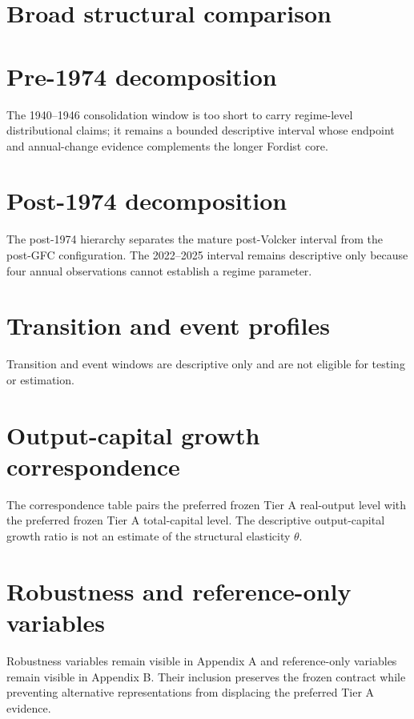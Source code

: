 \documentclass[11pt]{article}
\begin{document}
\section{Broad structural comparison}

\section{Pre-1974 decomposition}
The 1940--1946 consolidation window is too short to carry regime-level distributional claims; it remains a bounded descriptive interval whose endpoint and annual-change evidence complements the longer Fordist core.

\section{Post-1974 decomposition}
The post-1974 hierarchy separates the mature post-Volcker interval from the post-GFC configuration. The 2022--2025 interval remains descriptive only because four annual observations cannot establish a regime parameter.

\section{Transition and event profiles}
Transition and event windows are descriptive only and are not eligible for testing or estimation.

\section{Output-capital growth correspondence}
The correspondence table pairs the preferred frozen Tier A real-output level with the preferred frozen Tier A total-capital level. The descriptive output-capital growth ratio is not an estimate of the structural elasticity $\theta$.

\section{Robustness and reference-only variables}
Robustness variables remain visible in Appendix A and reference-only variables remain visible in Appendix B. Their inclusion preserves the frozen contract while preventing alternative representations from displacing the preferred Tier A evidence.


\end{document}
